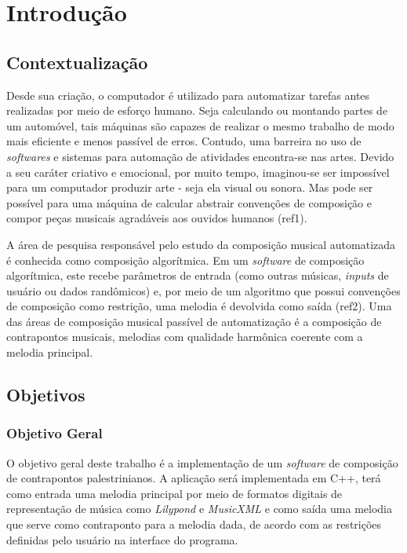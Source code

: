 \chapter*[Introdução]{Introdução}

\section{Contextualização}

Desde sua criação, o computador é utilizado para automatizar tarefas antes realizadas por meio de esforço humano. Seja calculando ou montando partes de um automóvel, tais máquinas são capazes de realizar o mesmo trabalho de modo mais eficiente e menos passível de erros. Contudo, uma barreira no uso de \textit{softwares} e sistemas para automação de atividades encontra-se nas artes. Devido a seu caráter criativo e emocional, por muito tempo, imaginou-se ser impossível para um computador produzir arte - seja ela visual ou sonora. Mas pode ser possível para uma máquina de calcular abstrair convenções de composição e compor peças musicais agradáveis aos ouvidos humanos (ref1).

A área de pesquisa responsável pelo estudo da composição musical automatizada é conhecida como composição algorítmica. Em um \textit{software} de composição algorítmica, este recebe parâmetros de entrada (como outras músicas, \textit{inputs} de usuário ou dados randômicos) e, por meio de um algoritmo que possui convenções de composição como restrição, uma melodia é devolvida como saída (ref2). Uma das áreas de composição musical passível de automatização é a composição de contrapontos musicais, melodias com qualidade harmônica coerente com a melodia principal.

\section{Objetivos}

\subsection{Objetivo Geral}

O objetivo geral deste trabalho é a implementação de um \textit{software} de composição de contrapontos palestrinianos. A aplicação será implementada em C++, terá como entrada uma melodia principal por meio de formatos digitais de representação de música como \textit{Lilypond} e \textit{MusicXML} e como saída uma melodia que serve como contraponto para a melodia dada, de acordo com as restrições definidas pelo usuário na interface do programa.

